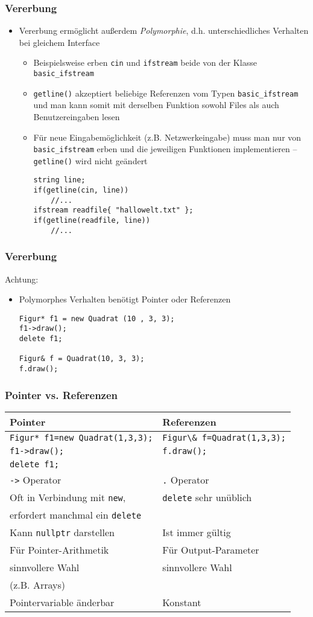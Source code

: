 \documentclass[]{beamer}
\newcommand{\bi}{\begin{itemize}}
\newcommand{\ei}{\end{itemize}}
\begin{document}
\begin{frame}[fragile]
	\frametitle{Vererbung}
	\bi
	\item Vererbung ermöglicht außerdem \emph{Polymorphie}, d.h. \newline unterschiedliches Verhalten bei gleichem Interface
	\bi
	\item Beispielsweise erben \lstinline|cin| und \lstinline|ifstream| beide von der Klasse \lstinline|basic_ifstream|
	\item \lstinline|getline()| akzeptiert beliebige Referenzen vom Typen \lstinline|basic_ifstream| und man kann somit mit derselben Funktion sowohl Files als auch Benutzereingaben lesen
	\item Für neue Eingabemöglichkeit (z.B. Netzwerkeingabe) muss man nur von \lstinline|basic_ifstream| erben und die jeweiligen Funktionen implementieren -- \lstinline|getline()| wird nicht geändert
	\begin{lstlisting}
string line;
if(getline(cin, line))
	//...
ifstream readfile{ "hallowelt.txt" };
if(getline(readfile, line))
	//...
	\end{lstlisting}
	\ei
	\ei
\end{frame}

\begin{frame}[fragile]
	\frametitle{Vererbung}
	Achtung:
	\bi
	\item Polymorphes Verhalten benötigt Pointer oder Referenzen
	\begin{lstlisting}
Figur* f1 = new Quadrat (10 , 3, 3);
f1->draw();
delete f1;

Figur& f = Quadrat(10, 3, 3);
f.draw();
	\end{lstlisting}
	\ei
\end{frame}

\begin{frame}
	\frametitle{Pointer vs. Referenzen}
	
	\begin{tabular}{l|l}
		\textbf{Pointer} & \textbf{Referenzen}\\\hline
		\small\lstinline|Figur* f1=new Quadrat(1,3,3);| & \lstinline|Figur\& f=Quadrat(1,3,3);|\\
		\lstinline|f1->draw();| & \lstinline|f.draw();|\\
		\lstinline|delete f1;| \\\hline
		\lstinline|->| Operator & \lstinline|.| Operator \\\hline
		Oft in Verbindung mit \lstinline|new|, & \lstinline|delete| sehr unüblich \\
		erfordert manchmal ein \lstinline|delete| &  \\\hline
		Kann \lstinline|nullptr| darstellen & Ist immer gültig \\\hline
		Für Pointer-Arithmetik& Für Output-Parameter  \\
		sinnvollere Wahl & sinnvollere Wahl\\
		(z.B. Arrays) \\\hline
		Pointervariable änderbar & Konstant
	\end{tabular}
\end{frame}
\end{document}
